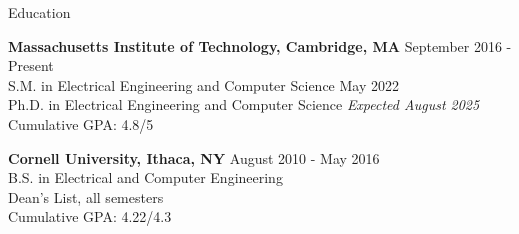 \documentclass{resume} %
\begin{document}

%
%


\begin{rSection}{Education}

{\bf Massachusetts Institute of Technology, Cambridge, MA} \hfill { September 2016 - Present} \\ 
S.M. in Electrical Engineering and Computer Science \hfill {May 2022} \\
Ph.D. in Electrical Engineering and Computer Science \hfill { \it{Expected August 2025}} \\
Cumulative GPA: 4.8/5

{\bf Cornell University, Ithaca, NY} \hfill { August 2010 - May 2016} \\ 
B.S. in Electrical and Computer Engineering \\
Dean's List, all semesters \\
Cumulative GPA: 4.22/4.3 

\end{rSection}

\end{document}
